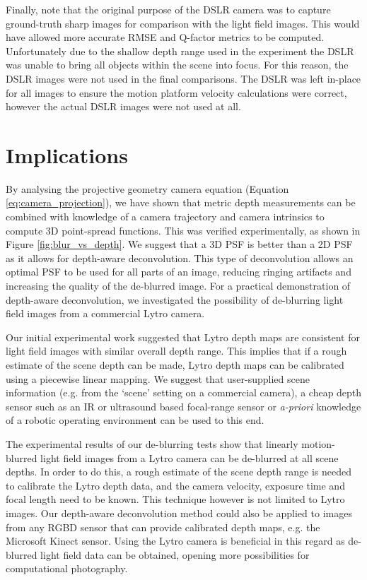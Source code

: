 Finally, note that the original purpose of the DSLR camera was to capture ground-truth sharp images for comparison with the light field images.
This would have allowed more accurate RMSE and Q-factor metrics to be computed.
Unfortunately due to the shallow depth range used in the experiment the DSLR was unable to bring all objects within the scene into focus.
For this reason, the DSLR images were not used in the final comparisons.
The DSLR was left in-place for all images to ensure the motion platform velocity calculations were correct, however the actual DSLR images were not used at all.

\section{Implications}
\label{sec:implications}

By analysing the projective geometry camera equation (Equation \ref{eq:camera_projection}), we have shown that metric depth measurements can be combined with knowledge of a camera trajectory and camera intrinsics to compute 3D point-spread functions.
This was verified experimentally, as shown in Figure \ref{fig:blur_vs_depth}.
We suggest that a 3D PSF is better than a 2D PSF as it allows for depth-aware deconvolution.
This type of deconvolution allows an optimal PSF to be used for all parts of an image, reducing ringing artifacts and increasing the quality of the de-blurred image.
For a practical demonstration of depth-aware deconvolution, we investigated the possibility of de-blurring light field images from a commercial Lytro camera.

Our initial experimental work suggested that Lytro depth maps are consistent for light field images with similar overall depth range.
This implies that if a rough estimate of the scene depth can be made, Lytro depth maps can be calibrated using a piecewise linear mapping.
We suggest that user-supplied scene information (e.g. from the \enquote*{scene} setting on a commercial camera), a cheap depth sensor such as an IR or ultrasound based focal-range sensor or \emph{a-priori} knowledge of a robotic operating environment can be used to this end.

The experimental results of our de-blurring tests show that linearly motion-blurred light field images from a Lytro camera can be de-blurred at all scene depths.
In order to do this, a rough estimate of the scene depth range is needed to calibrate the Lytro depth data, and the camera velocity, exposure time and focal length need to be known.
This technique however is not limited to Lytro images.
Our depth-aware deconvolution method could also be applied to images from any RGBD sensor that can provide calibrated depth maps, e.g. the Microsoft Kinect sensor. 
Using the Lytro camera is beneficial in this regard as de-blurred light field data can be obtained, opening more possibilities for computational photography.

